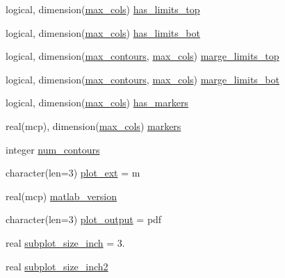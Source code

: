\begin{DoxyCompactItemize}
\item 
logical, dimension(\mbox{\hyperlink{namespacemcsamples_ae8386bad918d8af8d203683c01d5818c}{max\+\_\+cols}}) \mbox{\hyperlink{namespacemcsamples_a948a6bc42d1b7b001f55aeaaf2d5b3f8}{has\+\_\+limits\+\_\+top}}
\item 
logical, dimension(\mbox{\hyperlink{namespacemcsamples_ae8386bad918d8af8d203683c01d5818c}{max\+\_\+cols}}) \mbox{\hyperlink{namespacemcsamples_af020921aecf16dd5008460d6a82fdd64}{has\+\_\+limits\+\_\+bot}}
\item 
logical, dimension(\mbox{\hyperlink{namespacemcsamples_a878ea2f4d47feda9ed7a1701aabfb0d1}{max\+\_\+contours}}, \mbox{\hyperlink{namespacemcsamples_ae8386bad918d8af8d203683c01d5818c}{max\+\_\+cols}}) \mbox{\hyperlink{namespacemcsamples_a22f55004d2d1debc557bf626e9b2af89}{marge\+\_\+limits\+\_\+top}}
\item 
logical, dimension(\mbox{\hyperlink{namespacemcsamples_a878ea2f4d47feda9ed7a1701aabfb0d1}{max\+\_\+contours}}, \mbox{\hyperlink{namespacemcsamples_ae8386bad918d8af8d203683c01d5818c}{max\+\_\+cols}}) \mbox{\hyperlink{namespacemcsamples_a6c36f035fe1ec1e688afcc0ac112e425}{marge\+\_\+limits\+\_\+bot}}
\item 
logical, dimension(\mbox{\hyperlink{namespacemcsamples_ae8386bad918d8af8d203683c01d5818c}{max\+\_\+cols}}) \mbox{\hyperlink{namespacemcsamples_a0233de8ae126379ac2ebc11c0981db61}{has\+\_\+markers}}
\item 
real(mcp), dimension(\mbox{\hyperlink{namespacemcsamples_ae8386bad918d8af8d203683c01d5818c}{max\+\_\+cols}}) \mbox{\hyperlink{namespacemcsamples_ad7bc69baf30e862c773070e99974d483}{markers}}
\item 
integer \mbox{\hyperlink{namespacemcsamples_adb5eb76b1f11b911bf9e72be639d5226}{num\+\_\+contours}}
\item 
character(len=3) \mbox{\hyperlink{namespacemcsamples_ad18bd8eb2345c17a7aad3604eba3e3ad}{plot\+\_\+ext}} = \textquotesingle{}m\textquotesingle{}
\item 
real(mcp) \mbox{\hyperlink{namespacemcsamples_a24dc02cd209419956007efc05c309274}{matlab\+\_\+version}}
\item 
character(len=3) \mbox{\hyperlink{namespacemcsamples_a4aac456ce5052be90e290891a61466f1}{plot\+\_\+output}} = \textquotesingle{}pdf\textquotesingle{}
\item 
real \mbox{\hyperlink{namespacemcsamples_a5c59bb75d9bde473650c9d04a44e6010}{subplot\+\_\+size\+\_\+inch}} = 3.
\item 
real \mbox{\hyperlink{namespacemcsamples_a6dd34bac13f09636652e328d92707726}{subplot\+\_\+size\+\_\+inch2}}

\end{DoxyCompactItemize}
